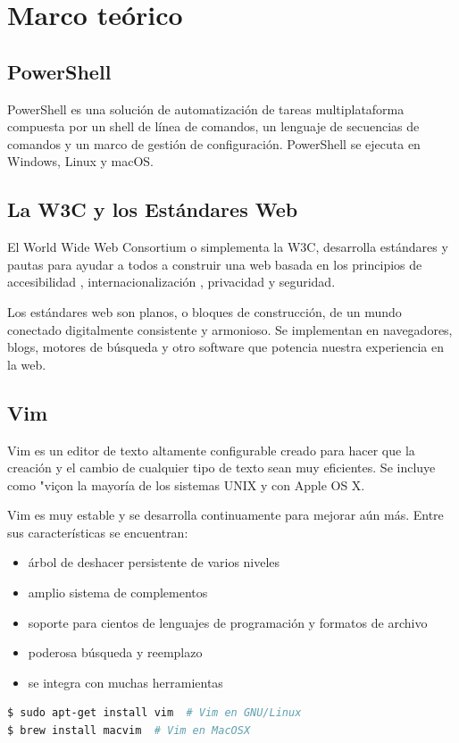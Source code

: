 \documentclass{article}
\begin{document}
\section{Marco teórico}
\subsection{PowerShell}
PowerShell es una solución de automatización de tareas multiplataforma compuesta por un shell de línea de comandos, un lenguaje de secuencias de comandos y un marco de gestión de configuración. PowerShell se ejecuta en Windows, Linux y macOS.

\subsection{La W3C y los Estándares Web}
El World Wide Web Consortium o simplementa la W3C, desarrolla estándares y pautas para ayudar a todos a construir una web basada en los principios de accesibilidad , internacionalización , privacidad y seguridad.

Los estándares web son planos, o bloques de construcción, de un mundo conectado digitalmente consistente y armonioso. Se implementan en navegadores, blogs, motores de búsqueda y otro software que potencia nuestra experiencia en la web.



\subsection{Vim}
Vim es un editor de texto altamente configurable creado para hacer que la creación y el cambio de cualquier tipo de texto sean muy eficientes. Se incluye como "viçon la mayoría de los sistemas UNIX y con Apple OS X.

Vim es muy estable y se desarrolla continuamente para mejorar aún más. Entre sus características se encuentran:
\begin{itemize}
    \item árbol de deshacer persistente de varios niveles
    \item amplio sistema de complementos
    \item soporte para cientos de lenguajes de programación y formatos de archivo
    \item poderosa búsqueda y reemplazo
    \item se integra con muchas herramientas
\end{itemize}


\begin{lstlisting}[language=bash]
$ sudo apt-get install vim  # Vim en GNU/Linux
$ brew install macvim  # Vim en MacOSX
\end{lstlisting}
\end{document}
